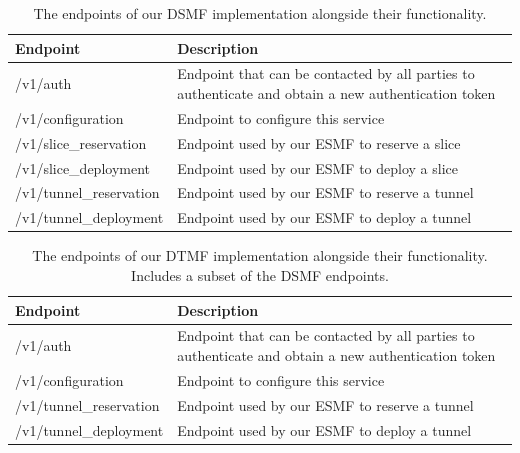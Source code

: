 \begin{table}[htp]
    \begin{tabularx}{\textwidth}{ |l|X| }
        \hline
        \textbf{Endpoint} & \textbf{Description} \\
        \hline
         /v1/auth & Endpoint that can be contacted by all parties to authenticate and obtain a new authentication token \\
         /v1/configuration & Endpoint to configure this service \\
        \hline
         /v1/slice\_reservation & Endpoint used by our ESMF to reserve a slice \\
         /v1/slice\_deployment & Endpoint used by our ESMF to deploy a slice \\
         /v1/tunnel\_reservation & Endpoint used by our ESMF to reserve a tunnel  \\
         /v1/tunnel\_deployment & Endpoint used by our ESMF to deploy a tunnel \\
        \hline
    \end{tabularx}
    \caption[DSMF endpoints]{The endpoints of our DSMF implementation alongside their functionality.}
    \label{table:dsmf}
\end{table}

\begin{table}[htp]
    \begin{tabularx}{\textwidth}{ |l|X| }
        \hline
        \textbf{Endpoint} & \textbf{Description} \\
        \hline
         /v1/auth & Endpoint that can be contacted by all parties to authenticate and obtain a new authentication token \\
         /v1/configuration & Endpoint to configure this service \\
        \hline
         /v1/tunnel\_reservation & Endpoint used by our ESMF to reserve a tunnel  \\
         /v1/tunnel\_deployment & Endpoint used by our ESMF to deploy a tunnel \\
        \hline
    \end{tabularx}
    \caption[DTMF endpoints]{The endpoints of our DTMF implementation alongside their functionality. Includes a subset of the DSMF endpoints.}
    \label{table:dtmf}
\end{table}

